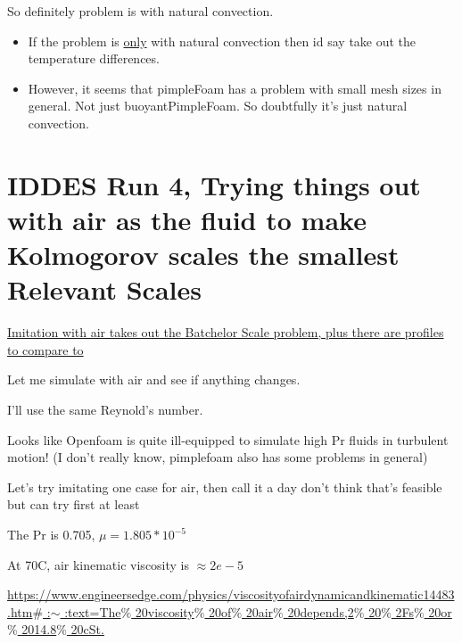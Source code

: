 \documentclass[12pt]{article}
\renewcommand{\_}{\kern-1.5pt\textunderscore\kern-1.5pt}
\begin{document}
So definitely problem is with natural convection.\par
\begin{itemize}
	\item If the problem is \uline{only} with natural convection then id say take out the temperature differences.\par

	\item However, it seems that pimpleFoam has a problem with small mesh sizes in general. Not just buoyantPimpleFoam. So doubtfully it’s just natural convection.\par
\end{itemize}

\section{IDDES Run 4, Trying things out with air as the fluid to make Kolmogorov scales the smallest Relevant Scales}

\uline{Imitation with air  takes out the Batchelor Scale problem, plus there are profiles to compare to}\par

Let me simulate with air and see if anything changes.\par

I’ll use the same Reynold’s number.\par

Looks like Openfoam is quite ill-equipped to simulate high Pr fluids in turbulent motion! (I don’t really know, pimplefoam also has some problems in general)\par

Let’s try imitating one case for air, then call it a day  don’t think that’s feasible but can try first at least\par

The Pr is 0.705,  \(  \mu =1.805\ast10^{-5}~ \) \par

At 70C, air kinematic viscosity is  \(  \approx 2e-5 \) \par

\href{https://www.engineersedge.com/physics/viscosity_of_air_dynamic_and_kinematic_14483.htm}{https://www.engineersedge.com/physics/viscosity\_of\_air\_dynamic\_and\_kinematic\_14483.htm$\#$ :$ \sim $ :text=The$\%$ 20viscosity$\%$ 20of$\%$ 20air$\%$ 20depends,2$\%$ 20$\%$ 2Fs$\%$ 20or$\%$ 2014.8$\%$ 20cSt.}\par
\end{document}
